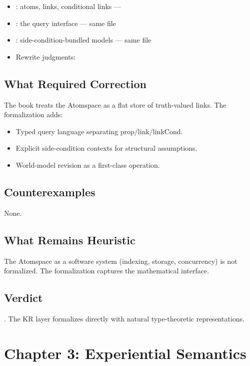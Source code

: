 \documentclass[11pt,openany]{report}
\begin{document}
\begin{itemize}
\item {}: atoms, links, conditional links --- 
\item {}: the query interface --- same file
\item {}: side-condition-bundled models --- same file
\item Rewrite judgments: 
\end{itemize}

\section{What Required Correction}

The book treats the Atomspace as a flat store of truth-valued links.
The formalization adds:
\begin{itemize}
\item Typed query language separating prop/link/linkCond.
\item Explicit side-condition contexts for structural assumptions.
\item World-model revision as a first-class operation.
\end{itemize}

\section{Counterexamples}

None.

\section{What Remains Heuristic}

The Atomspace as a software system (indexing, storage, concurrency) is
not formalized.  The formalization captures the mathematical interface.

\section{Verdict}

\verdictClean{}.  The KR layer formalizes directly with natural type-theoretic
representations.


\chapter{Chapter 3: Experiential Semantics}
\label{ch:review-ch3}
\end{document}
